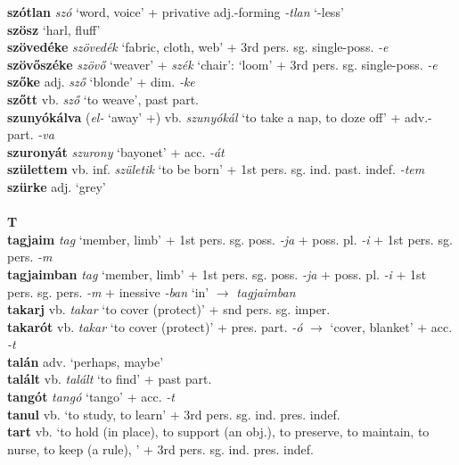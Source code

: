 \documentclass[11pt]{article}
\begin{document}
\textbf{szótlan} \emph{szó} `word, voice' + privative
adj.\hyp{}forming \emph{-tlan} `-less' \\
\textbf{szösz} `harl, fluff' \\
\textbf{szövedéke} \emph{szövedék} `fabric, cloth, web' + 3rd
pers. sg. single\hyp{}poss. \emph{-e} \\
\textbf{szövőszéke} \emph{szövő} `weaver' + \emph{szék} `chair':
`loom' + 3rd pers. sg. single\hyp{}poss. \emph{-e} \\
\textbf{szőke} adj. \emph{sző} `blonde' + dim. \emph{-ke} \\
\textbf{szőtt} vb. \emph{sző} `to weave', past part. \\
\textbf{szunyókálva} (\emph{el-} `away' +)
vb. \emph{szunyókál} `to take a nap, to doze off' +
adv.\hyp{}part. \emph{-va} \\
\textbf{szuronyát} \emph{szurony} `bayonet' + acc. \emph{-át} \\
\textbf{születtem} vb. inf. \emph{születik} `to be born' + 1st
pers. sg. ind. past. indef. \emph{-tem} \\
\textbf{szürke} adj. `grey' \\
\ \\
\noindent \textbf{\large T} \\
\textbf{tagjaim} \emph{tag} `member, limb' + 1st
pers. sg. poss. \emph{-ja} + poss. pl. \emph{-i} + 1st
  pers. sg. pers. \emph{-m} \\
\textbf{tagjaimban} \emph{tag} `member, limb' + 1st
pers. sg. poss. \emph{-ja} + poss. pl. \emph{-i} + 1st
  pers. sg. pers. \emph{-m} + inessive \emph{-ban} `in'
  $\rightarrow$ \emph{tagjaimban} \\
\textbf{takarj} vb. \emph{takar} `to cover (protect)' + snd pers. sg. imper. \\
\textbf{takarót} vb. \emph{takar} `to cover (protect)' +
pres. part. \emph{-ó} $\rightarrow$ `cover, blanket' +
acc. \emph{-t} \\
\textbf{talán} adv. `perhaps, maybe' \\
\textbf{talált} vb. \emph{talált} `to find' + past part. \\
\textbf{tangót} \emph{tangó} `tango' + acc. \emph{-t} \\
\textbf{tanul} vb. `to study, to learn' + 3rd pers. sg. ind. pres. indef. \\
\textbf{tart} vb. `to hold (in place), to support (an
obj.), to preserve, to maintain, to nurse, to keep (a rule), ' + 3rd
pers. sg. ind. pres. indef. \\
\end{document}
